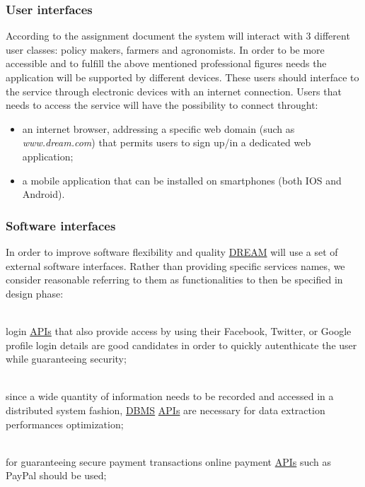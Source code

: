 \subsubsection{User interfaces} %
\label{sect:user_interfaces}
According to the assignment document the system will interact with 3 different user classes: policy makers, farmers and agronomists. In order to be more accessible and to fulfill the above mentioned professional figures needs the application will be supported by different devices. These users should interface to the service through electronic devices with an internet connection. Users that needs to access the service will have the possibility to connect throught:
\begin{itemize}
    \item an internet browser, addressing a specific web domain (such as \textit{www.dream.com}) that permits users to sign up/in a dedicated web application;
    \item a mobile application that can be installed on smartphones (both IOS and Android).
\end{itemize}


\subsubsection{Software interfaces}
In order to improve software flexibility and quality \hyperref[tab:acronymsTable]{DREAM} will use a set of external software interfaces. Rather than providing specific services names, we consider reasonable referring to them as functionalities to then be specified in design phase:
\begin{description}[font=~\normalfont\scshape]
    \item[\textbf{\textcolor{myblue}{universal logins}}] \hfill \\login \hyperref[tab:acronymsTable]{APIs} that also provide access by using their Facebook, Twitter, or Google profile login details are good candidates in order to quickly autenthicate the user while guaranteeing security;
    \item[\textbf{\textcolor{myblue}{big data manipulation}}] \hfill \\since a wide quantity of information needs to be recorded and accessed in a distributed system fashion, \hyperref[tab:acronymsTable]{DBMS} \hyperref[tab:acronymsTable]{APIs} are necessary for data extraction performances optimization;
    \item[\textbf{\textcolor{myblue}{third party payment processing}}] \hfill \\for guaranteeing secure payment transactions online payment \hyperref[tab:acronymsTable]{APIs} such as PayPal should be used;
    \item[\textbf{\textcolor{myblue}{third party data science research}}] \hfill \\%
\end{description}

